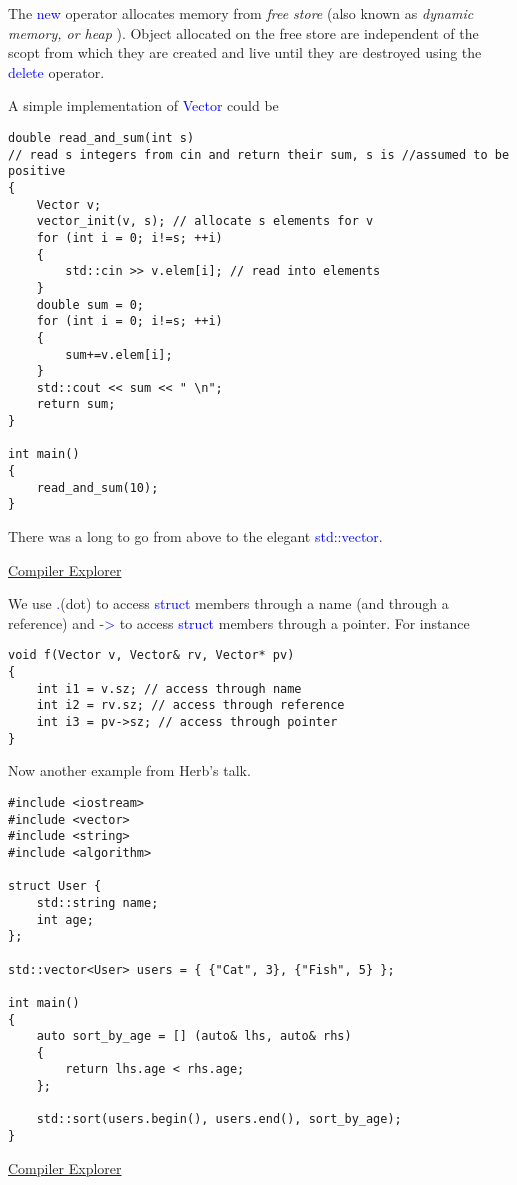 \documentclass{article}
\newcommand{\be}[1]{\textcolor{blue}{#1}}
\begin{document}
The \be{new} operator allocates memory from \emph{free store} (also known as \emph{dynamic memory, or heap} ).
Object allocated on the free store are independent of the scopt from which they are created and live until they are destroyed using the \be{delete} operator.

A simple implementation of \be{Vector} could be 
\begin{verbatim}
double read_and_sum(int s)
// read s integers from cin and return their sum, s is //assumed to be positive
{
    Vector v;
    vector_init(v, s); // allocate s elements for v
    for (int i = 0; i!=s; ++i)
    {
        std::cin >> v.elem[i]; // read into elements
    }
    double sum = 0;
    for (int i = 0; i!=s; ++i)
    {
        sum+=v.elem[i];
    }
    std::cout << sum << " \n";
    return sum;
}

int main()
{
    read_and_sum(10);
}	
\end{verbatim}
There was a long to go from above to the elegant \be{std::vector}.

\href{https://godbolt.org/z/vjEMeP}{Compiler Explorer}

We use \be{.}(dot) to access \be{struct} members through a name (and through a reference) and \be{->} to access 
\be{struct} members through a pointer. For instance

\begin{verbatim}
void f(Vector v, Vector& rv, Vector* pv)
{
    int i1 = v.sz; // access through name
    int i2 = rv.sz; // access through reference
    int i3 = pv->sz; // access through pointer
}
\end{verbatim}


Now another example from Herb's talk.
\begin{verbatim}
#include <iostream>
#include <vector>
#include <string>
#include <algorithm>

struct User {
    std::string name;
    int age;
};

std::vector<User> users = { {"Cat", 3}, {"Fish", 5} };

int main()
{
    auto sort_by_age = [] (auto& lhs, auto& rhs)
    {
        return lhs.age < rhs.age;
    };

    std::sort(users.begin(), users.end(), sort_by_age);
}
\end{verbatim}
\href{https://godbolt.org/z/noea68}{Compiler Explorer}
\end{document}
